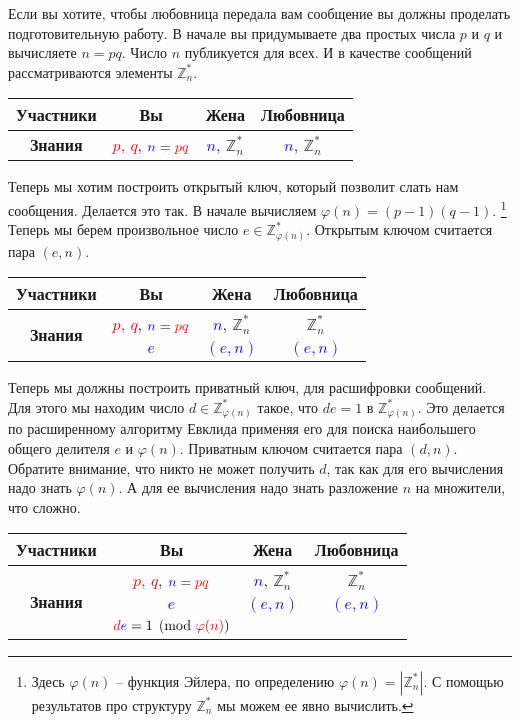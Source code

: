 Если вы хотите, чтобы любовница передала вам сообщение вы должны проделать подготовительную работу. В начале вы придумываете два простых числа $p$ и $q$ и вычисляете $n = pq$. Число $n$ публикуется для всех. И в качестве сообщений рассматриваются элементы $\mathbb Z_n^*$.
\begin{center}
\begin{tabular}{|c|c|c|c|}
\hline
{\bf Участники}&{Вы}&{Жена}&{Любовница}\\
\hline
{\bf Знания}&{\textcolor{red}{$p$, $q$}, $\textcolor{blue}{n} = \textcolor{red}{pq}$}&{\textcolor{blue}{$n$}, $\mathbb Z_n^*$}&{\textcolor{blue}{$n$}, $\mathbb Z_n^*$}\\
\hline
\end{tabular}
\end{center}

Теперь мы хотим построить открытый ключ, который позволит слать нам сообщения. Делается это так. В начале вычисляем $\varphi(n) = (p-1)(q-1)$.%
\footnote{Здесь $\varphi(n)$ -- функция Эйлера, по определению $\varphi(n) = |\mathbb Z_n^*|$. С помощью результатов про структуру $\mathbb Z_n^*$ мы можем ее явно вычислить.}
Теперь мы берем произвольное число $e\in \mathbb Z_{\varphi(n)}^*$. Открытым ключом считается пара $(e, n)$.
\begin{center}
\begin{tabular}{|c|c|c|c|}
\hline
{\bf Участники}&{Вы}&{Жена}&{Любовница}\\
\hline
\multirow{2}{*}{\bf Знания}&{\textcolor{red}{$p$, $q$}, $\textcolor{blue}{n} = \textcolor{red}{pq}$}&{\textcolor{blue}{$n$}, $\mathbb Z_n^*$}&{$\mathbb Z_n^*$}\\
{}&{\textcolor{blue}{$e$}}&{\textcolor{blue}{$(e, n)$}}&{\textcolor{blue}{$(e, n)$}}\\
\hline
\end{tabular}
\end{center}

Теперь мы должны построить приватный ключ, для расшифровки сообщений. Для этого мы находим число $d\in \mathbb Z_{\varphi(n)}^*$ такое, что $de = 1$ в $\mathbb Z_{\varphi(n)}^*$. Это делается по расширенному алгоритму Евклида применяя его для поиска наибольшего общего делителя $e$ и $\varphi(n)$.
Приватным ключом считается пара $(d, n)$. Обратите внимание, что никто не может получить $d$, так как для его вычисления надо знать $\varphi(n)$. А для ее вычисления надо знать разложение $n$ на множители, что сложно.
\begin{center}
\begin{tabular}{|c|c|c|c|}
\hline
{\bf Участники}&{Вы}&{Жена}&{Любовница}\\
\hline
\multirow{3}{*}{\bf Знания}&{\textcolor{red}{$p$, $q$}, $\textcolor{blue}{n} = \textcolor{red}{pq}$}&{\textcolor{blue}{$n$}, $\mathbb Z_n^*$}&{$\mathbb Z_n^*$}\\
{}&{\textcolor{blue}{$e$}}&{\textcolor{blue}{$(e, n)$}}&{\textcolor{blue}{$(e, n)$}}\\
{}&{$\textcolor{red}{d}\textcolor{blue}{e} = 1 \pmod{ \textcolor{red}{\varphi(n)}}$}&{}&{}\\
\hline
\end{tabular}
\end{center}


